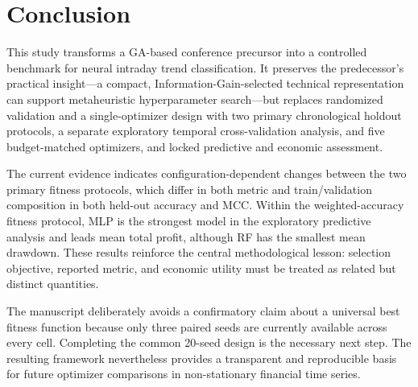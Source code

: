 \section{Conclusion}\label{sec:conclusion}

This study transforms a GA-based conference precursor into a controlled benchmark for neural intraday trend classification. It preserves the predecessor's practical insight---a compact, Information-Gain-selected technical representation can support metaheuristic hyperparameter search---but replaces randomized validation and a single-optimizer design with two primary chronological holdout protocols, a separate exploratory temporal cross-validation analysis, and five budget-matched optimizers, and locked predictive and economic assessment.

The current evidence indicates configuration-dependent changes between the two primary fitness protocols, which differ in both metric and train/validation composition in both held-out accuracy and MCC. Within the weighted-accuracy fitness protocol, MLP is the strongest model in the exploratory predictive analysis and leads mean total profit, although RF has the smallest mean drawdown. These results reinforce the central methodological lesson: selection objective, reported metric, and economic utility must be treated as related but distinct quantities.

The manuscript deliberately avoids a confirmatory claim about a universal best fitness function because only three paired seeds are currently available across every cell. Completing the common 20-seed design is the necessary next step. The resulting framework nevertheless provides a transparent and reproducible basis for future optimizer comparisons in non-stationary financial time series.
